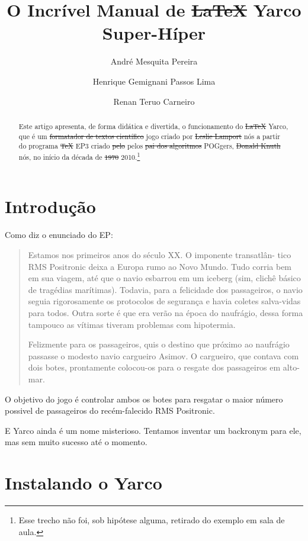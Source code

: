 \documentclass[10pt,brazil]{article}
\title{O Incrível Manual de \sout{LaTeX} Yarco Super-Híper}
\author{André Mesquita Pereira \and Henrique Gemignani Passos Lima \and Renan Teruo Carneiro}
\begin{document}

\maketitle

\begin{abstract}

Este artigo apresenta, de forma didática e divertida, o funcionamento
do \sout{\LaTeX} Yarco, que é um \sout{formatador de textos científico} jogo criado por \sout{Leslie
Lamport} nós a partir do programa \sout{\TeX} EP3 criado \sout{pelo} pelos \sout{pai dos algoritmos} POGgers,
\sout{Donald Knuth} nós, no início da década de \sout{1970} 2010.\footnote{Esse trecho não foi, sob hipótese alguma,
retirado do exemplo em sala de aula.}

\end{abstract}

\section{Introdução}

Como diz o enunciado do EP:

\begin{quote}
Estamos nos primeiros anos do século XX. O imponente transatlân- tico RMS Positronic deixa a Europa rumo ao Novo Mundo.
 Tudo corria bem em sua viagem, até que o navio esbarrou em um iceberg (sim, clichê básico de tragédias marítimas).
 Todavia, para a felicidade dos passageiros, o navio seguia rigorosamente os protocolos de segurança e havia coletes
 salva-vidas para todos. Outra sorte é que era verão na época do naufrágio, dessa forma tampouco as vítimas tiveram
 problemas com hipotermia.

Felizmente para os passageiros, quis o destino que próximo ao naufrágio passasse o modesto navio cargueiro Asimov. O cargueiro, que contava com dois botes, prontamente colocou-os para o resgate dos passageiros em alto-mar.
\end{quote}

O objetivo do jogo é controlar ambos os botes para resgatar o maior número possivel de passageiros do
recém-falecido RMS Positronic.

E Yarco ainda é um nome misterioso. Tentamos inventar um backronym para ele, mas sem muito sucesso até o momento.

\section{Instalando o Yarco}
\end{document}
